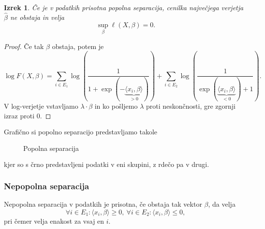\documentclass[12pt,a4paper]{amsart}
\theoremstyle{definition} %
\theoremstyle{plain} %
\newtheorem{izrek}[definicija]{Izrek}
\begin{document}
\begin{izrek}
    Če je v podatkih prisotna popolna separacija, cenilka največjega verjetja $\hat{\beta}$ ne obstaja in velja
    \[
        \sup_{\beta} \ell(X,\beta) = 0.
    \]
\end{izrek}

\begin{proof}
    Če tak $\beta$ obstaja, potem je
    \[
    \log F(X,\beta) = \sum_{i\in E_{1}} \log\left(\frac{1}{1+\exp(-\underbrace{\langle x_{i},\beta \rangle}_{>0})}\right) + \sum_{i\in E_{2}}\log\left(\frac{1}{\exp(\underbrace{\langle x_{i},\beta \rangle}_{<0}) + 1}\right).
    \]
    V log-verjetje vstavljamo $\lambda \cdot \beta$ in ko pošljemo $\lambda$ proti neskončnosti, gre zgornji izraz proti 0.
\end{proof}

Grafično si popolno separacijo predstavljamo takole
\begin{center}
    \begin{figure}[h!]
    \caption{Popolna separacija}
\end{figure}
\end{center}
kjer so s črno predstavljeni podatki v eni skupini, z rdečo pa v drugi.

\subsubsection{Nepopolna separacija}
Nepopolna separacija v podatkih je prisotna, če obstaja tak vektor $\beta$, da velja
\begin{equation}\label{nepopolnaSep}
    \forall i \in E_{1}: \langle x_{i},\beta \rangle \geq 0,~\forall i\in E_{2}: \langle x_{i},\beta \rangle \leq 0,
\end{equation}
pri čemer velja enakost za vsaj en $i$.
\end{document}
